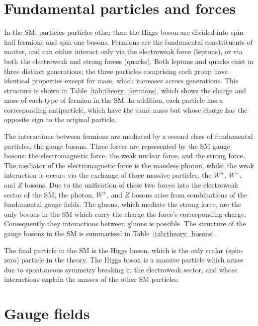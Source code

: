 \section{Fundamental particles and forces}
In the SM, particles particles other than the Higgs boson are divided into spin-half fermions
and spin-one bosons.
Fermions are the fundamental constrituents of matter, 
and can either interact only via the electroweak force (leptons), 
or via both the electroweak and strong forces (quarks).
Both leptons and quarks exist in three distinct generations;
the three particles comprising each group have identical properties 
except for mass, which increases across generations.
This structure is shown in Table~\ref{tab:theory_fermions}, 
which shows the charge and mass of each type of fermion in the SM.
In addition, each particle has a corresponding antiparticle, 
which have the same mass but whose charge has the opposite sign to the original particle.

The interactions between fermions are mediated by a second class of fundamental particles, 
the gauge bosons.
Three forces are represented by the SM gauge bosons: 
the electromagnetic force, the weak nuclear force, and the strong force.
The mediator of the electromagnetic force is the massless photon, 
whilst the weak interaction is occurs via the exchange of three massive particles, 
the $W^+$, $W^-$, and $Z$ bosons.
Due to the unification of these two forces into the electroweak sector of the SM, 
the photon, $W^\pm$, and $Z$ bosons arise from combinations of the fundamental gauge fields.
The gluons, which mediate the strong force, 
are the only bosons in the SM which carry the charge the force's corresponding charge.
Consequently they interactions between gluons is possible.
The structure of the gauge bosons in the SM is summarised in Table~\ref{tab:theory_bosons}.

The final particle in the SM is the Higgs boson, 
which is the only scalar (spin-zero) particle in the theory.
The Higgs boson is a massive particle which arises 
due to spontaneous symmetry breaking in the electroweak sector, 
and whose interactions explain the masses of the other SM particles.

\section{Gauge fields}

